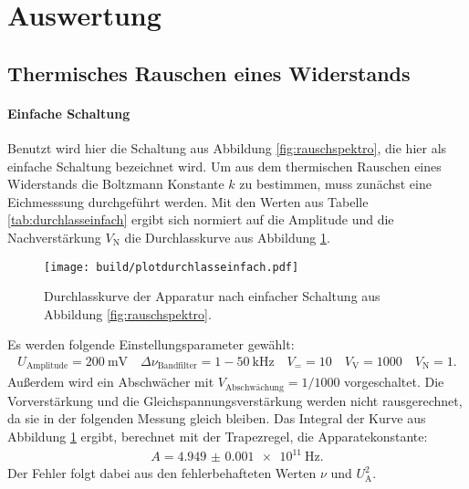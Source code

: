 \section{Auswertung}
\label{sec:Auswertung}

\subsection{Thermisches Rauschen eines Widerstands}

\paragraph{Einfache Schaltung}

Benutzt wird hier die Schaltung aus Abbildung \ref{fig:rauschspektro}, die hier als einfache Schaltung bezeichnet wird. Um aus dem thermischen Rauschen eines Widerstands die Boltzmann Konstante $k$ zu bestimmen, muss zunächst eine Eichmesssung durchgeführt werden. Mit den Werten aus Tabelle \ref{tab:durchlasseinfach} ergibt sich normiert auf die Amplitude und die Nachverstärkung $V_\text{N}$ die Durchlasskurve aus Abbildung \ref{fig:plotdurchlasseinfach}.
\begin{figure}
  \centering
  \texttt{[image: build/plotdurchlasseinfach.pdf]}
  \caption{Durchlasskurve der Apparatur nach einfacher Schaltung aus Abbildung \ref{fig:rauschspektro}.}
  \label{fig:plotdurchlasseinfach}
\end{figure}
Es werden folgende Einstellungsparameter gewählt:
\begin{align*}
  U_\text{Amplitude} = \SI{200}{\milli\volt} \quad \Delta \nu_\text{Bandfilter} = \num{1}-\SI{50}{\kilo\hertz}\quad V_= = 10 \quad V_\text{V} = 1000 \quad V_\text{N} = 1.
\end{align*}
Außerdem wird ein Abschwächer mit $V_\text{Abschwächung} = 1/1000$ vorgeschaltet. Die Vorverstärkung und die Gleichspannungsverstärkung werden nicht rausgerechnet, da sie in der folgenden Messung gleich bleiben. Das Integral der Kurve aus Abbildung \ref{fig:plotdurchlasseinfach} ergibt, berechnet mit der Trapezregel, die Apparatekonstante:
\begin{align}
  A = \SI{4.949(1)e11}{\hertz}.
\end{align}
Der Fehler folgt dabei aus den fehlerbehafteten Werten $\nu$ und $U_\text{A}^2$.

